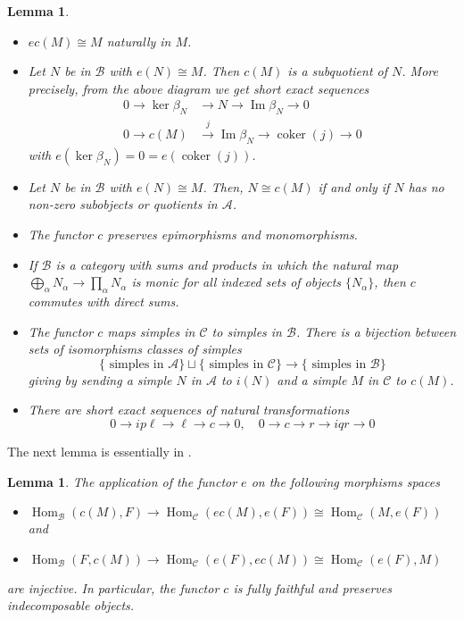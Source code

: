 \documentclass[11pt,a4paper]{amsart}
\theoremstyle{plain}
\newtheorem{lem}[thm]{Lemma}
\theoremstyle{definition}
\begin{document}
\begin{lem}\
\label{IntExt} 
\begin{itemize}

\item[(1)] ${e} c(M)\cong M$ naturally in $M$. 
\item[(2)] Let $N$ be in ${\mathcal{B}}$ with ${e} (N)\cong M$. Then $c(M)$ is a subquotient of $N$. More precisely, from the above diagram we get short exact sequences 
\[ 
\begin{aligned}
0\to \operatorname{ker} \beta_N  &\to N \to \operatorname{Im} \beta_N\to 0\\
0\to c(M) & \xrightarrow{j} \operatorname{Im} \beta_N \to \operatorname{coker} (j)\to 0 
\end{aligned}
\] 
with ${e} (\operatorname{ker} \beta_N)=0 = {e} (\operatorname{coker} (j))$. 
\item[(3)] Let $N$ be in ${\mathcal{B}}$ with ${e} (N)\cong M$. Then, $N\cong c(M)$ if and only if $N$ has no non-zero subobjects or quotients in ${\mathcal{A}}$.
\item[(4)] The functor $c$ preserves epimorphisms and monomorphisms. 
\item[(5)] If ${\mathcal{B}}$ is a category with sums and products in which the natural map 
$\bigoplus_{\alpha} N_{\alpha} \to \prod_{\alpha} N_{\alpha}$ is monic for all indexed sets of objects 
$\{ N_{\alpha}\}$, then $c$ commutes with direct sums. 
\item[(6)] The functor $c$ maps simples in ${\mathcal{C}}$ to simples in ${\mathcal{B}}$. There is a bijection between sets of isomorphisms classes of simples 
\[ 
\{ \text{ simples in }{\mathcal{A}}\} \sqcup \{ \text{ simples in }{\mathcal{C}}\} \to \{ \text{ simples in }{\mathcal{B}}\}
\]
giving by sending a simple $N$ in ${\mathcal{A}}$ to $i(N)$ and a simple $M$ in ${\mathcal{C}}$ to $c(M)$. 
\item[(7)] There are short exact sequences of natural transformations 
\[ 
0\to ip\ell \to \ell \to c \to 0, \quad 0\to c\to r \to iqr \to 0
\]
\end{itemize}
\end{lem}

The next lemma is essentially in \cite{FP}.

\begin{lem}
The application of the functor ${e} $ on the following morphisms spaces 
\begin{itemize}
\item[(1)] $\operatorname{Hom}_{\mathcal{B}} (c(M), F) \to \operatorname{Hom}_{\mathcal{C}} ({e} c(M), {e} (F)) \cong \operatorname{Hom}_{\mathcal{C}} (M, {e} (F))$ and  
\item[(2)] $\operatorname{Hom}_{\mathcal{B}}  (F,c(M)) \to \operatorname{Hom}_{\mathcal{C}} ({e} (F), {e} c(M)) \cong \operatorname{Hom}_{\mathcal{C}} ({e} (F), M)$
\end{itemize}
are injective. In particular, the functor $c$ is fully faithful and preserves indecomposable objects. 
\end{lem}
\end{document}
